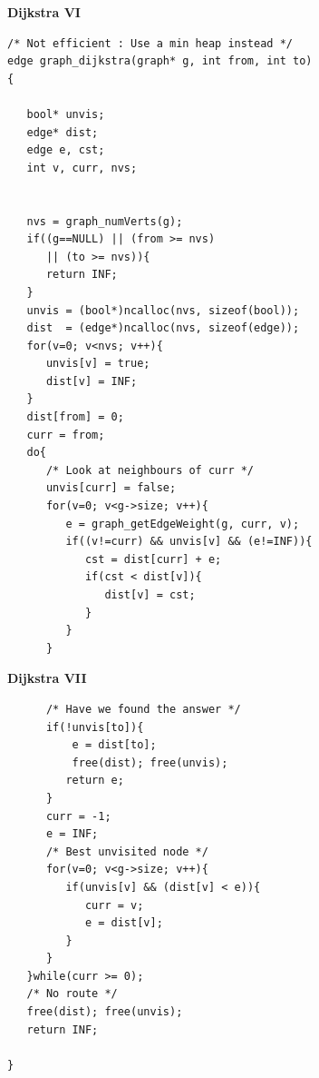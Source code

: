 \newpage
{\samepage
\begin{center}
{\Large{\bf Dijkstra VI}}
\end{center}
{\small
\begin{verbatim}
/* Not efficient : Use a min heap instead */
edge graph_dijkstra(graph* g, int from, int to)
{

   bool* unvis;
   edge* dist;
   edge e, cst;
   int v, curr, nvs;


   nvs = graph_numVerts(g);
   if((g==NULL) || (from >= nvs)
      || (to >= nvs)){
      return INF;
   }
   unvis = (bool*)ncalloc(nvs, sizeof(bool));
   dist  = (edge*)ncalloc(nvs, sizeof(edge));
   for(v=0; v<nvs; v++){
      unvis[v] = true;
      dist[v] = INF;
   }
   dist[from] = 0;
   curr = from;
   do{
      /* Look at neighbours of curr */
      unvis[curr] = false;
      for(v=0; v<g->size; v++){
         e = graph_getEdgeWeight(g, curr, v);
         if((v!=curr) && unvis[v] && (e!=INF)){
            cst = dist[curr] + e;
            if(cst < dist[v]){
               dist[v] = cst;
            }
         }
      }
\end{verbatim}
}}

\newpage
{\samepage
\begin{center}
{\Large{\bf Dijkstra VII}}
\end{center}
{\small
\begin{verbatim}
      /* Have we found the answer */
      if(!unvis[to]){
          e = dist[to];
          free(dist); free(unvis);
         return e;
      }
      curr = -1;
      e = INF;
      /* Best unvisited node */
      for(v=0; v<g->size; v++){
         if(unvis[v] && (dist[v] < e)){
            curr = v;
            e = dist[v];
         }
      }
   }while(curr >= 0);
   /* No route */
   free(dist); free(unvis);
   return INF;

}
\end{verbatim}
}}
